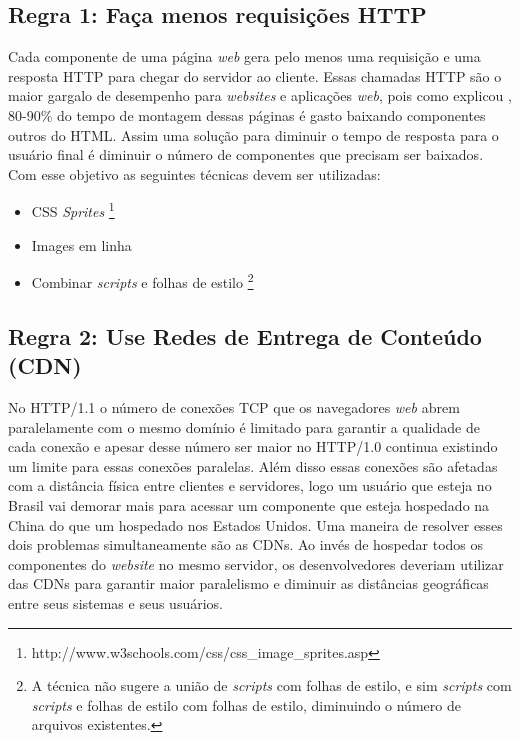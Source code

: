 \subsection{Regra 1: Faça menos requisições HTTP}
\label{subsec:highperformance_regra1}
Cada componente de uma página \textit{web} gera pelo menos uma requisição e uma resposta HTTP para chegar do servidor ao cliente. Essas chamadas HTTP são o maior gargalo de desempenho para \textit{websites} e aplicações \textit{web}, pois como explicou \cite{HighPerformance}, 80-90\% do tempo de montagem dessas páginas é gasto baixando componentes outros do HTML. Assim uma solução para diminuir o tempo de resposta para o usuário final é diminuir o número de componentes que precisam ser baixados. Com esse objetivo as seguintes técnicas devem ser utilizadas:
	\begin{itemize}
		\item CSS \textit{Sprites} \footnote{http://www.w3schools.com/css/css\_image\_sprites.asp}
		\item Images em linha
		\item Combinar \textit{scripts} e folhas de estilo \footnote{A técnica não sugere a união de \textit{scripts} com folhas de estilo, e sim \textit{scripts} com \textit{scripts} e folhas de estilo com folhas de estilo, diminuindo o número de arquivos existentes.}
	\end{itemize}

\subsection{Regra 2: Use Redes de Entrega de Conteúdo (CDN)}
\label{subsec:highperformance_regra2}
No HTTP/1.1 o número de conexões TCP que os navegadores \textit{web} abrem paralelamente com o mesmo domínio é limitado para garantir a qualidade de cada conexão e apesar desse número ser maior no HTTP/1.0 continua existindo um limite para essas conexões paralelas. Além disso essas conexões são afetadas com a distância física entre clientes e servidores, logo um usuário que esteja no Brasil vai demorar mais para acessar um componente que esteja hospedado na China do que um hospedado nos Estados Unidos. Uma maneira de resolver esses dois problemas simultaneamente são as CDNs. Ao invés de hospedar todos os componentes do \textit{website} no mesmo servidor, os desenvolvedores deveriam utilizar das CDNs para garantir maior paralelismo e diminuir as distâncias geográficas entre seus sistemas  e seus usuários.

